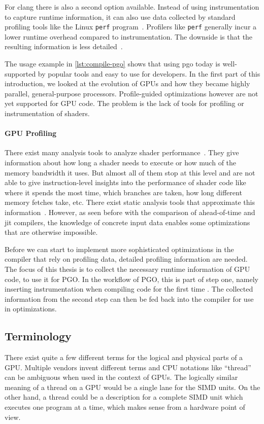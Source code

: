For clang there is also a second option available. Instead of using instrumentation to capture runtime information, it can also use data collected by standard profiling tools like the Linux \texttt{perf} program~\cite{LinuxPerf}. Profilers like \texttt{perf} generally incur a lower runtime overhead compared to instrumentation. The downside is that the resulting information is less detailed~\cite{ClangManual}.

The usage example in \cref{lst:compile-pgo} shows that using \gls{pgo} today is well-supported by popular tools and easy to use for developers.
In the first part of this introduction, we looked at the evolution of GPUs and how they became highly parallel, general-purpose processors.
Profile-guided optimizations however are not yet supported for GPU code. The problem is the lack of tools for profiling or instrumentation of shaders.

\paragraph{GPU Profiling} There exist many analysis tools to analyze shader performance~\cite{RenderDoc, NvidiaShaderPerf}. They give information about how long a shader needs to execute or how much of the memory bandwidth it uses. But almost all of them stop at this level and are not able to give instruction-level insights into the performance of shader code like where it spends the most time, which branches are taken, how long different memory fetches take, etc.
There exist static analysis tools that approximate this information~\cite{AMDShaderAnalyzer}. However, as seen before with the comparison of ahead-of-time and \gls{jit} compilers, the knowledge of concrete input data enables some optimizations that are otherwise impossible.

Before we can start to implement more sophisticated optimizations in the compiler that rely on profiling data, detailed profiling information are needed.
The focus of this thesis is to collect the necessary runtime information of GPU code, to use it for PGO. In the workflow of PGO, this is part of step one, namely inserting instrumentation when compiling code for the first time%
. The collected information from the second step can then be fed back into the compiler for use in optimizations.

\subsection{Terminology}
\label{sub:terminology}
There exist quite a few different terms for the logical and physical parts of a GPU. Multiple vendors invent different terms and CPU notations like \enquote{thread} can be ambiguous when used in the context of GPUs. The logically similar meaning of a thread on a GPU would be a single lane for the SIMD units. On the other hand, a thread could be a description for a complete SIMD unit which executes one program at a time, which makes sense from a hardware point of view.

